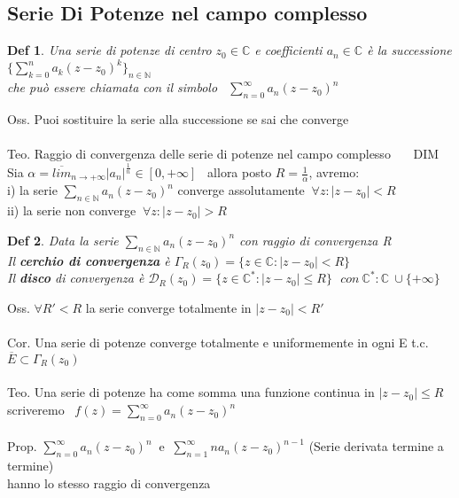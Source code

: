 \documentclass{article}
\theoremstyle{unnumbered}
\newtheorem* {theoremT}{Def}
\theoremstyle{unnumbered1}
\newenvironment{defi}{\begin{gBox}\begin{theoremT}}{\end{theoremT}\end{gBox}}
\begin{document}
\subsection{Serie Di Potenze nel campo complesso}
%
\begin{defi}Una serie di potenze di centro $z_0\in\mathbb{C}$ e coefficienti $a_n\in\mathbb{C}$ è la successione $\{\sum_{k=0}^n a_k(z-z_0)^k  \}_{n\in\mathbb{N}}$\\
che può essere chiamata con il simbolo \ $\sum_{n=0}^{\infty} a_n(z-z_0)^n$
\end{defi}
%
Oss.  Puoi sostituire la serie alla successione se sai che converge\\ \\
%
%
Teo.  Raggio di convergenza delle serie di potenze nel campo complesso \ \ \ DIM\\
Sia $\alpha=\overline{lim}_{n\rightarrow +\infty} |a_n|^{\frac{1}{n}} \in [0,+\infty]$ \ allora posto $R=\frac{1}{\alpha}$, avremo:\\
i) la serie $\sum_{n\in\mathbb{N}}a_n(z-z_0)^n$ converge assolutamente $\ \forall z : |z-z_0|<R$\\
ii) la serie non converge $\ \forall z : |z-z_0|>R$
%
%
\begin{defi}
Data la serie $\sum_{n\in\mathbb{N}}a_n(z-z_0)^n$ con raggio di convergenza R\\
Il \textbf{cerchio di convergenza} è $\Gamma_R(z_0)=\{z\in\mathbb{C} : |z-z_0|<R \}$\\
Il \textbf{disco} di convergenza è $\mathcal{D}_R(z_0)=\{z\in\mathbb{C}^* : |z-z_0|\le R \} \ \ \ con \ \mathbb{C}^*: \mathbb{C} \ \cup \{+\infty\}$
\end{defi}
%
%
Oss.  $\forall R'<R$ la serie converge totalmente in $|z-z_0|<R'$\\ \\
%
Cor. Una serie di potenze converge totalmente e uniformemente in ogni E t.c. $\overline{E}\subset\Gamma_R(z_0)$\\ \\
%
%
Teo. Una serie di potenze ha come somma una funzione continua in $|z-z_0|\le R $ \\
scriveremo \ $f(z)= \sum_{n=0}^{\infty} a_n(z-z_0)^n$ \\ \\
%
%
Prop. $ \sum_{n=0}^{\infty} a_n(z-z_0)^n \ \text{ e } \  \sum_{n=1}^{\infty} na_n(z-z_0)^{n-1}$ (Serie derivata termine a termine)\\  hanno lo stesso raggio di convergenza\\ \\
\end{document}
